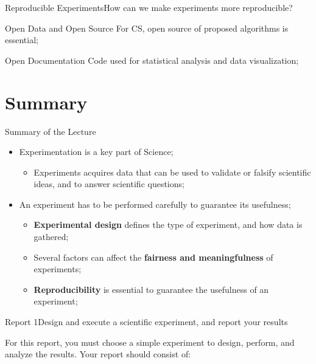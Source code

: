 \documentclass{beamer}
\begin{document}
\begin{CJK}{UTF8}{ipxm}
\begin{frame}{Reproducible Experiments}{How can we make experiments more reproducible?}
\begin{exampleblock}{Open Data and Open Source}
    For CS, open source of proposed algorithms is essential;
  \end{exampleblock}
  \begin{exampleblock}{Open Documentation}
    Code used for statistical analysis and data visualization;
  \end{exampleblock}
\end{frame}

\section{Summary}

\begin{frame}{Summary of the Lecture}
  \begin{itemize}
    \item Experimentation is a key part of Science;
    \begin{itemize}
      \item Experiments acquires data that can be used to validate or falsify scientific ideas, and to answer scientific questions;
    \end{itemize}
    \bigskip

    \item An experiment has to be performed carefully to guarantee its usefulness;
    \begin{itemize}
      \item {\bf Experimental design} defines the type of experiment, and how data is gathered;
      \item Several factors can affect the {\bf fairness and meaningfulness} of experiments;
      \item {\bf Reproducibility} is essential to guarantee the usefulness of an experiment;
    \end{itemize}
  \end{itemize}

\end{frame}

\begin{frame}{Report 1}{Design and execute a scientific experiment, and report your results}

  For this report, you must choose a simple experiment to design, perform, and analyze the results. Your report should consist of:\medskip


\end{frame}
\end{CJK}
\end{document}

